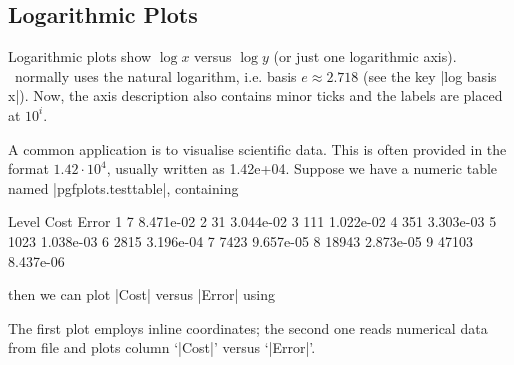 \subsection{Logarithmic Plots}
Logarithmic plots show $\log x$ versus $\log y$  (or just one logarithmic axis). \PGFPlots\ normally uses the natural logarithm, i.e. basis $e\approx2.718$ (see the key |log basis x|). Now, the axis description also contains minor ticks and the labels are placed at $10^i$.
\begin{codeexample}[]
\end{codeexample}
A common application is to visualise scientific data. This is often provided in the format $1.42\cdot10^4$, usually written as 1.42e+04. Suppose we have a numeric table named |pgfplots.testtable|, containing
\begin{codeexample}[code only,tabsize=6]
Level Cost  Error
1     7     8.471e-02
2     31    3.044e-02
3     111   1.022e-02
4     351   3.303e-03
5     1023  1.038e-03
6     2815  3.196e-04
7     7423  9.657e-05
8     18943 2.873e-05
9     47103 8.437e-06
\end{codeexample}
\noindent then we can plot |Cost| versus |Error| using
\begin{codeexample}[]
\end{codeexample}
The first plot employs inline coordinates; the second one reads numerical data from file and plots column `|Cost|' versus `|Error|'.

